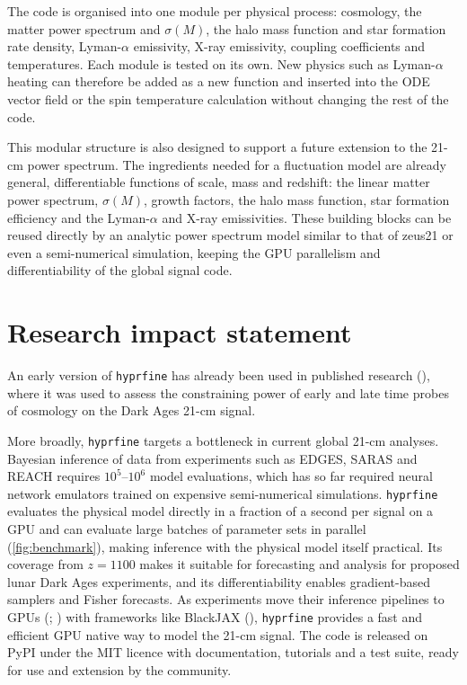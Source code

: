 \documentclass[
]{article}
\begin{document}
The code is organised into one module per physical process: cosmology,
the matter power spectrum and \(\sigma(M)\), the halo mass function and
star formation rate density, Lyman-\(\alpha\) emissivity, X-ray
emissivity, coupling coefficients and temperatures. Each module is
tested on its own. New physics such as Lyman-\(\alpha\) heating can
therefore be added as a new function and inserted into the ODE vector
field or the spin temperature calculation without changing the rest of
the code.

This modular structure is also designed to support a future extension to
the 21-cm power spectrum. The ingredients needed for a fluctuation model
are already general, differentiable functions of scale, mass and
redshift: the linear matter power spectrum, \(\sigma(M)\), growth
factors, the halo mass function, star formation efficiency and the
Lyman-\(\alpha\) and X-ray emissivities. These building blocks can be
reused directly by an analytic power spectrum model similar to that of
zeus21 or even a semi-numerical simulation, keeping the GPU parallelism
and differentiability of the global signal code.

\section{Research impact statement}\label{research-impact-statement}

An early version of \texttt{hyprfine} has already been used in published
research (), where it was
used to assess the constraining power of early and late time probes of
cosmology on the Dark Ages 21-cm signal.

More broadly, \texttt{hyprfine} targets a bottleneck in current global
21-cm analyses. Bayesian inference of data from experiments such as
EDGES, SARAS and REACH requires \(10^5\)--\(10^6\) model evaluations,
which has so far required neural network emulators trained on expensive
semi-numerical simulations. \texttt{hyprfine} evaluates the physical
model directly in a fraction of a second per signal on a GPU and can
evaluate large batches of parameter sets in parallel
(\autoref{fig:benchmark}), making inference with the physical model
itself practical. Its coverage from \(z=1100\) makes it suitable for
forecasting and analysis for proposed lunar Dark Ages experiments, and
its differentiability enables gradient-based samplers and Fisher
forecasts. As experiments move their inference pipelines to GPUs
(;
) with
frameworks like BlackJAX (), \texttt{hyprfine} provides a fast and efficient GPU native
way to model the 21-cm signal. The code is released on PyPI under the
MIT licence with documentation, tutorials and a test suite, ready for
use and extension by the community.
\end{document}
